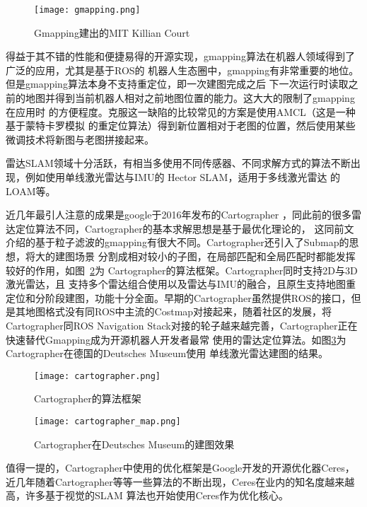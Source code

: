 \begin{figure}
  \centering
  \texttt{[image: gmapping.png]}
  \caption{Gmapping建出的MIT Killian Court}
  \label{fig:gmapping}
\end{figure}

得益于其不错的性能和便捷易得的开源实现，gmapping算法在机器人领域得到了广泛的应用，尤其是基于ROS的
机器人生态圈中，gmapping有非常重要的地位。但是gmapping算法本身不支持重定位，即一次建图完成之后
下一次运行时读取之前的地图并得到当前机器人相对之前地图位置的能力。这大大的限制了gmapping在应用时
的方便程度。克服这一缺陷的比较常见的方案是使用AMCL\cite{fox2002kld}（这是一种基于蒙特卡罗模拟
的重定位算法）得到新位置相对于老图的位置，然后使用某些微调技术将新图与老图拼接起来。

雷达SLAM领域十分活跃，有相当多使用不同传感器、不同求解方式的算法不断出现，例如使用单线激光雷达与IMU的
Hector SLAM\cite{KohlbrecherMeyerStrykKlingaufFlexibleSlamSystem2011}，适用于多线激光雷达
的LOAM\cite{zhang2014loam}等。

近几年最引人注意的成果是google于2016年发布的Cartographer
\cite{hess2016real}，同此前的很多雷达定位算法不同，Cartographer的基本求解思想是基于最优化理论的，
这同前文介绍的基于粒子滤波的gmapping有很大不同。Cartographer还引入了Submap的思想，将大的建图场景
分割成相对较小的子图，在局部匹配和全局匹配时都能发挥较好的作用，如图~\ref{fig:cartographer}为
Cartographer的算法框架。Cartographer同时支持2D与3D激光雷达，且
支持多个雷达组合使用以及雷达与IMU的融合，且原生支持地图重定位和分阶段建图，功能十分全面。早期的Cartographer虽然提供ROS的接口，但是其地图格式没有同ROS中主流的Costmap对接起来，随着社区的发展，将Cartographer同ROS
Navigation Stack对接的轮子越来越完善，Cartographer正在快速替代Gmapping成为开源机器人开发者最常
使用的雷达定位算法。如图\ref{fig:cartographer_map}为Cartographer在德国的Deutsches Museum使用
单线激光雷达建图的结果。

\begin{figure}[ht] %
  \centering
  \texttt{[image: cartographer.png]}
  \caption{Cartographer的算法框架}
  \label{fig:cartographer}
\end{figure}

\begin{figure}
  \centering
  \texttt{[image: cartographer\_map.png]}
  \caption{Cartographer在Deutsches Museum的建图效果}
  \label{fig:cartographer_map}
\end{figure}



值得一提的，Cartographer中使用的优化框架是Google开发的开源优化器Ceres\cite{ceres-solver}，
近几年随着Cartographer等等一些算法的不断出现，Ceres在业内的知名度越来越高，许多基于视觉的SLAM
算法也开始使用Ceres作为优化核心。

